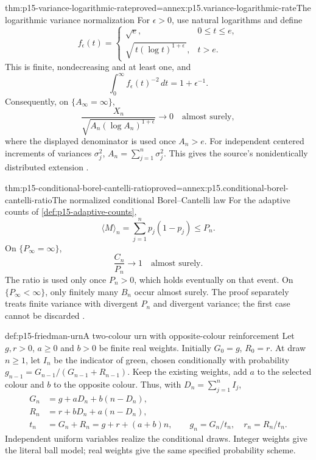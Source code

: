 \begin{hbtheorem}{thm:p15-variance-logarithmic-rate}{proved=annex:p15.variance-logarithmic-rate}{The logarithmic variance normalization}
For \(\epsilon>0\), use natural logarithms and define
\[
 f_\epsilon(t)=
 \begin{cases}
 \sqrt e,&0\leq t\leq e,\\
 \sqrt{\,t(\log t)^{1+\epsilon}\,},&t>e.
 \end{cases}
\]
This is finite, nondecreasing and at least one, and
\[
                           \int_0^\infty f_\epsilon(t)^{-2}\,dt
                                                    =1+\epsilon^{-1}.
\]
Consequently, on \(\{A_\infty=\infty\}\),
\[
                  \frac{X_n}{\sqrt{A_n(\log A_n)^{1+\epsilon}}}
                                   \longrightarrow0\quad\text{almost surely},
\]
where the displayed denominator is used once \(A_n>e\).
For independent centered increments of variances \(\sigma_j^2\),
\(A_n=\sum_{j=1}^n\sigma_j^2\).
This gives the source's nonidentically distributed extension
\cite[ex.~4.5.4]{DurrettPTEAuthor2019}.
\end{hbtheorem}

\begin{hbtheorem}{thm:p15-conditional-borel-cantelli-ratio}{proved=annex:p15.conditional-borel-cantelli-ratio}{The normalized conditional Borel--Cantelli law}
For the adaptive counts of \cref{def:p15-adaptive-counts},
\[
                         \langle M\rangle_n
                                     =\sum_{j=1}^np_j(1-p_j)\leq P_n.
\]
On \(\{P_\infty=\infty\}\),
\[
                                \frac{C_n}{P_n}\longrightarrow1
                                               \quad\text{almost surely}.
\]
The ratio is used only once \(P_n>0\), which holds eventually
on that event. On \(\{P_\infty<\infty\}\), only finitely many
\(B_n\) occur almost surely.
The proof separately treats finite variance with divergent \(P_n\)
and divergent variance; the first case cannot be discarded
\cite[thm.~4.5.5 and remark]{DurrettPTEAuthor2019}.
\end{hbtheorem}

\begin{hbdefinition}{def:p15-friedman-urn}{A two-colour urn with opposite-colour reinforcement}
Let \(g,r>0\), \(a\geq0\) and \(b>0\) be finite real weights.
Initially \(G_0=g\), \(R_0=r\). At draw \(n\geq1\), let \(I_n\)
be the indicator of green, chosen conditionally with probability
\(g_{n-1}=G_{n-1}/(G_{n-1}+R_{n-1})\).
Keep the existing weights, add \(a\) to the selected colour and
\(b\) to the opposite colour. Thus, with \(D_n=\sum_{j=1}^nI_j\),
\[
 \begin{split}
 G_n&=g+aD_n+b(n-D_n),\\
 R_n&=r+bD_n+a(n-D_n),\\
 t_n&=G_n+R_n=g+r+(a+b)n,\qquad
 g_n=G_n/t_n,\quad r_n=R_n/t_n.
 \end{split}
\]
Independent uniform variables realize the conditional draws.
Integer weights give the literal ball model; real weights give the
same specified probability scheme.
\end{hbdefinition}

